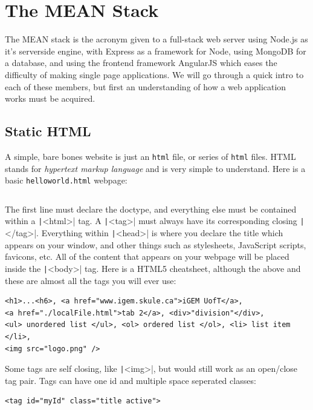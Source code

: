 \section{The MEAN Stack}

The MEAN stack is the acronym given to a full-stack web server using Node.js as
it's serverside engine, with Express as a framework for Node, using MongoDB for
a database, and using the frontend framework AngularJS which eases the 
difficulty of making single page applications. We will go through a quick intro
to each of these members, but first an understanding of how a web application
works must be acquired. 


\subsection{Static HTML}

A simple, bare bones website is just an \texttt{html} file, or series of
\texttt{html} files. HTML stands for \textit{hypertext markup language} and is 
very simple to understand. Here is a basic \texttt{helloworld.html} webpage:


\inputminted{html}{files/html/helloworld.html}

The first line must declare the doctype, and everything else must be contained
within a \texttt|<html>| tag. A \texttt|<tag>| must always
have its corresponding closing \texttt|</tag>|. Everything within 
\texttt|<head>| is where you declare the title which appears on your
window, and other things such as stylesheets, JavaScript scripts, favicons, etc.
All of the content that appears on your webpage will be placed inside the
\texttt|<body>| tag. Here is a HTML5 cheatsheet, although the above
and these are almost all the tags you will ever use:

\begin{verbatim}
<h1>...<h6>, <a href="www.igem.skule.ca">iGEM UofT</a>, 
<a href="./localFile.html">tab 2</a>, <div>"division"</div>, 
<ul> unordered list </ul>, <ol> ordered list </ol>, <li> list item </li>,
<img src="logo.png" />
\end{verbatim}

Some tags are self closing, like \texttt|<img>|, but would still work
as an open/close tag pair. Tags can have one id and multiple space seperated
classes:

\begin{verbatim}
<tag id="myId" class="title active">
\end{verbatim}

